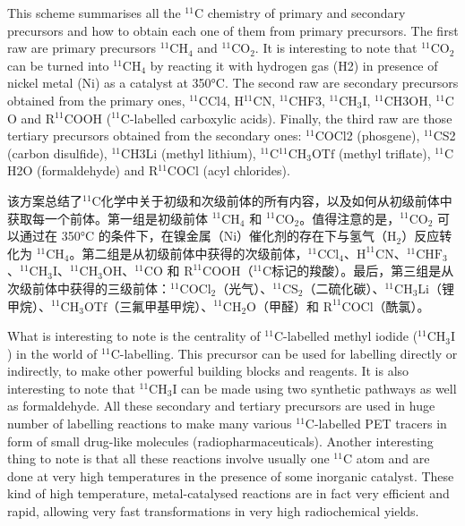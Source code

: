\documentclass[dvipsnames, svgnames,a4paper,11pt]{article}
\begin{document}
This scheme summarises all the ${}^\mathrm{11}\mathrm{C}$ chemistry of primary and secondary precursors and how to obtain each one of them from primary precursors. The first raw are primary precursors ${}^\mathrm{11}\mathrm{CH_4}$ and ${}^\mathrm{11}\mathrm{CO_2}$. It is interesting to note that ${}^\mathrm{11}\mathrm{CO_2}$ can be turned into ${}^\mathrm{11}\mathrm{CH_4}$ by reacting it with hydrogen gas (H2) in presence of nickel metal (Ni) as a catalyst at 350°C. The second raw are secondary precursors obtained from the primary ones, ${}^\mathrm{11}\mathrm{C}$Cl4, H${}^\mathrm{11}\mathrm{C}$N, ${}^\mathrm{11}\mathrm{C}$HF3, ${}^\mathrm{11}\mathrm{CH_3I}$, ${}^\mathrm{11}\mathrm{C}$H3OH, ${}^\mathrm{11}\mathrm{C}$O and R${}^\mathrm{11}\mathrm{C}$OOH (${}^\mathrm{11}\mathrm{C}$-labelled carboxylic acids). Finally, the third raw are those tertiary precursors obtained from the secondary ones: ${}^\mathrm{11}\mathrm{C}$OCl2 (phosgene), ${}^\mathrm{11}\mathrm{C}$S2 (carbon disulfide), ${}^\mathrm{11}\mathrm{C}$H3Li (methyl lithium), ${}^\mathrm{11}\mathrm{C{}^\mathrm{11}\mathrm{CH_3OTf}}$ (methyl triflate), ${}^\mathrm{11}\mathrm{C}$H2O (formaldehyde) and R${}^\mathrm{11}\mathrm{C}$OCl (acyl chlorides).

该方案总结了${}^\mathrm{11}\mathrm{C}$化学中关于初级和次级前体的所有内容，以及如何从初级前体中获取每一个前体。第一组是初级前体 $\mathrm{^{11}CH_4}$ 和 $\mathrm{^{11}CO_2}$。值得注意的是，$\mathrm{^{11}CO_2}$ 可以通过在 350°C 的条件下，在镍金属（$\mathrm{Ni}$）催化剂的存在下与氢气（$\mathrm{H_2}$）反应转化为 $\mathrm{^{11}CH_4}$。第二组是从初级前体中获得的次级前体，$\mathrm{^{11}CCl_4}$、$\mathrm{H^{11}CN}$、$\mathrm{^{11}CHF_3}$、$\mathrm{^{11}CH_3I}$、$\mathrm{^{11}CH_3OH}$、$\mathrm{^{11}CO}$ 和 $\mathrm{R^{11}COOH}$（${}^\mathrm{11}\mathrm{C}$标记的羧酸）。最后，第三组是从次级前体中获得的三级前体：$\mathrm{^{11}COCl_2}$（光气）、$\mathrm{^{11}CS_2}$（二硫化碳）、$\mathrm{^{11}CH_3Li}$（锂甲烷）、$\mathrm{^{11}CH_3OTf}$（三氟甲基甲烷）、$\mathrm{^{11}CH_2O}$（甲醛）和 $\mathrm{R^{11}COCl}$（酰氯）。

What is interesting to note is the centrality of ${}^\mathrm{11}\mathrm{C}$-labelled methyl iodide (${}^\mathrm{11}\mathrm{CH_3I}$) in the world of ${}^\mathrm{11}\mathrm{C}$-labelling. This precursor can be used for labelling directly or indirectly, to make other powerful building blocks and reagents. It is also interesting to note that ${}^\mathrm{11}\mathrm{CH_3I}$ can be made using two synthetic pathways as well as formaldehyde. All these secondary and tertiary precursors are used in huge number of labelling reactions to make many various ${}^\mathrm{11}\mathrm{C}$-labelled PET tracers in form of small drug-like molecules (radiopharmaceuticals). Another interesting thing to note is that all these reactions involve usually one ${}^\mathrm{11}\mathrm{C}$ atom and are done at very high temperatures in the presence of some inorganic catalyst. These kind of high temperature, metal-catalysed reactions are in fact very efficient and rapid, allowing very fast transformations in very high radiochemical yields.
\end{document}
